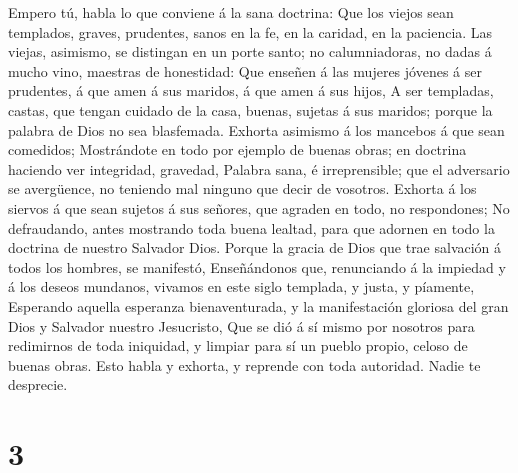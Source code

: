  Empero tú, habla lo que conviene á la sana doctrina:
 Que los viejos sean templados, graves, prudentes, sanos
en la fe, en la caridad, en la paciencia.  Las viejas,
asimismo, se distingan en un porte santo; no calumniadoras, no dadas á
mucho vino, maestras de honestidad:  Que enseñen á las
mujeres jóvenes á ser prudentes, á que amen á sus maridos, á que amen á
sus hijos,  A ser templadas, castas, que tengan cuidado de
la casa, buenas, sujetas á sus maridos; porque la palabra de Dios no sea
blasfemada.  Exhorta asimismo á los mancebos á que sean
comedidos;  Mostrándote en todo por ejemplo de buenas
obras; en doctrina haciendo ver integridad, gravedad, 
Palabra sana, é irreprensible; que el adversario se avergüence, no
teniendo mal ninguno que decir de vosotros.  Exhorta á los
siervos á que sean sujetos á sus señores, que agraden en todo, no
respondones;  No defraudando, antes mostrando toda buena
lealtad, para que adornen en todo la doctrina de nuestro Salvador Dios.
 Porque la gracia de Dios que trae salvación á todos los
hombres, se manifestó,  Enseñándonos que, renunciando á
la impiedad y á los deseos mundanos, vivamos en este siglo templada, y
justa, y píamente,  Esperando aquella esperanza
bienaventurada, y la manifestación gloriosa del gran Dios y Salvador
nuestro Jesucristo,  Que se dió á sí mismo por nosotros
para redimirnos de toda iniquidad, y limpiar para sí un pueblo propio,
celoso de buenas obras.  Esto habla y exhorta, y reprende
con toda autoridad. Nadie te desprecie.

\hypertarget{section-2}{%
\section{3}\label{section-2}}

